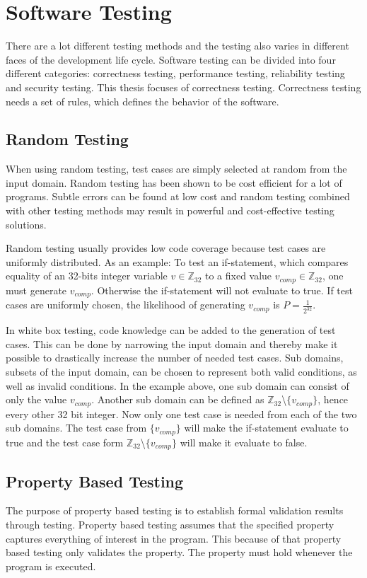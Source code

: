 \section{Software Testing}
There are a lot different testing methods and the testing also varies
in different faces of the development life cycle. Software testing can
be divided into four different categories: correctness testing,
performance testing, reliability testing and security testing. This
thesis focuses of correctness testing. Correctness testing needs a set
of rules, which defines the behavior of the software. \cite{mellon}

\subsection{Random Testing}
When using random testing, test cases are simply selected at random
from the input domain. Random testing has been shown to be cost
efficient for a lot of programs. Subtle errors can be found at low
cost and random testing combined with other testing methods may result
in powerful and cost-effective testing solutions. \cite{mellon}

Random testing usually provides low code coverage because test cases
are uniformly distributed. As an example: To test an if-statement, which
compares equality of an 32-bits integer variable $v \in \mathbb{Z}_{32}$
to a fixed value $v_{comp} \in \mathbb{Z}_{32}$,
one must generate $v_{comp}$. Otherwise the if-statement will not evaluate to true.
If test cases are uniformly
chosen, the likelihood of generating $v_{comp}$ is $P = \frac{1}{2^{32}}$.
\cite{RandomTesting:Microsoft}

In white box testing, code knowledge can be added to the
generation of test cases. This can be done by narrowing the input domain
and thereby make it possible to drastically increase the number of needed test cases.
Sub domains, subsets of the input domain, can be chosen to represent both valid
conditions, as well as invalid conditions. In the example above, one sub domain
can consist of only the value $v_{comp}$. Another sub domain can be defined as
$\mathbb{Z}_{32}$\textbackslash$\{v_{comp}\}$, hence every other 32 bit integer.
Now only one test case is needed from each of the two sub
domains. The test case from $\{v_{comp}\}$ will make the if-statement evaluate to
true and the test case form $\mathbb{Z}_{32}$\textbackslash$\{v_{comp}\}$ will
make it evaluate to false.
\cite{RandomTesting:Revisited}

\subsection{Property Based Testing}
The purpose of property based testing is to establish formal
validation results through testing. Property based testing assumes
that the specified property captures everything of interest in the
program. This because of that property based testing only validates the
property. The property must hold whenever the program is
executed. \cite{Fink:1997:PTN:263244.263267}

